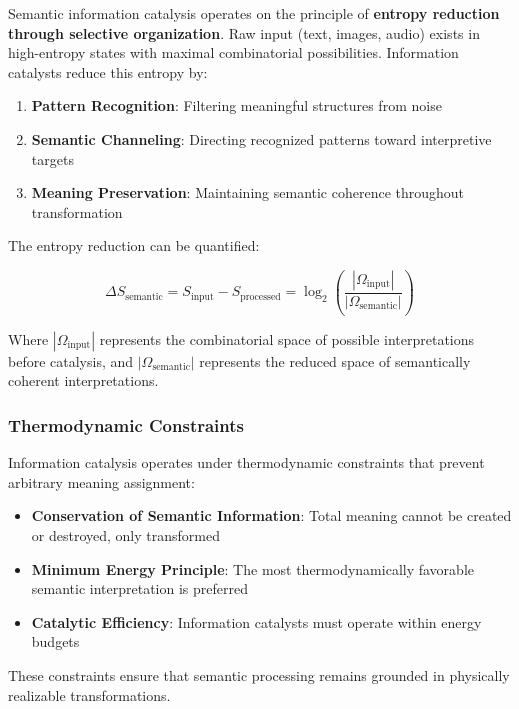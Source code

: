 \documentclass[12pt,a4paper,twoside]{article}
\begin{document}
Semantic information catalysis operates on the principle of \textbf{entropy reduction through selective organization}. Raw input (text, images, audio) exists in high-entropy states with maximal combinatorial possibilities. Information catalysts reduce this entropy by:

\begin{enumerate}
\item \textbf{Pattern Recognition}: Filtering meaningful structures from noise
\item \textbf{Semantic Channeling}: Directing recognized patterns toward interpretive targets
\item \textbf{Meaning Preservation}: Maintaining semantic coherence throughout transformation
\end{enumerate}

The entropy reduction can be quantified:

\begin{equation}
\Delta S_{\text{semantic}} = S_{\text{input}} - S_{\text{processed}} = \log_2\left(\frac{|\Omega_{\text{input}}|}{|\Omega_{\text{semantic}}|}\right)
\end{equation}

Where $|\Omega_{\text{input}}|$ represents the combinatorial space of possible interpretations before catalysis, and $|\Omega_{\text{semantic}}|$ represents the reduced space of semantically coherent interpretations.

\subsubsection{Thermodynamic Constraints}

Information catalysis operates under thermodynamic constraints that prevent arbitrary meaning assignment:

\begin{itemize}
\item \textbf{Conservation of Semantic Information}: Total meaning cannot be created or destroyed, only transformed
\item \textbf{Minimum Energy Principle}: The most thermodynamically favorable semantic interpretation is preferred
\item \textbf{Catalytic Efficiency}: Information catalysts must operate within energy budgets
\end{itemize}

These constraints ensure that semantic processing remains grounded in physically realizable transformations.
\end{document}
